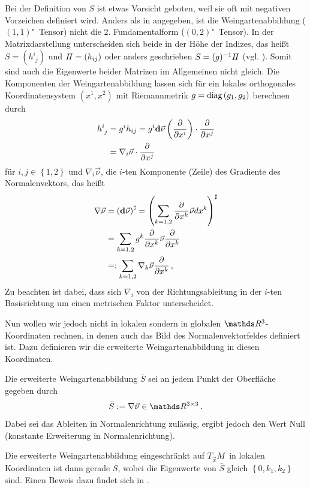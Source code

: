   Bei der Definition von \( S \) ist etwas Vorsicht geboten, weil sie oft mit negativen Vorzeichen definiert wird.
  Anders als in \cite{heine} angegeben, ist die Weingartenabbildung (\( (1,1) \)"~Tensor) nicht die 2. Fundamentalform
  (\( (0,2) \)"~Tensor). 
  In der Matrixdarstellung unterscheiden sich beide in der Höhe der Indizes, das heißt
  \( S = \left(h^{i}_{\phantom{i}j}\right)\) und \( I \! I = \left( h_{ij} \right) \) oder anders geschrieben   \( S = (g)^{-1} I \! I \)
  (vgl. \cite{FirstCourse}).
  Somit sind auch die Eigenwerte beider Matrizen im Allgemeinen nicht gleich.
  Die Komponenten der Weingartenabbildung lassen sich für ein lokales orthogonales Koordinatensystem \( \left( x^{1},x^{2} \right) \)
  mit Riemannmetrik \( g=\text{diag}\left( g_{1},g_{2} \right) \) berechnen durch
  \begin{align}
    h^{i}_{\phantom{i}j} &=  g^{i}h_{ij} = g^{i} \mathbf{d}\vec{\nu}\left(\frac{\partial}{\partial x^{i}}\right) 
                                                  \cdot \frac{\partial}{\partial x^{j}} \\
                          &= \nabla_{i} \vec{\nu} \cdot \frac{\partial}{\partial x^{j}}
  \end{align}
  für \( i,j\in\left\{ 1,2 \right\} \) und \( \nabla_{i} \vec{\nu} \), die \( i \)-ten Komponente (Zeile) des Gradiente des
  Normalenvektors,
  das heißt
  \begin{align}
    \nabla\vec{\nu} &= \left( \mathbf{d} \vec{\nu}\right)^{\sharp}
                     = \left( \sum_{k=1,2} \frac{\partial}{\partial x^{k}} \vec{\nu} dx^{k} \right)^{\sharp} \\
                    &= \sum_{k=1,2} g^{k}\frac{\partial}{\partial x^{k}} \vec{\nu}\frac{\partial}{\partial x^{k}}  \\
                    &=: \sum_{k=1,2} \nabla_{k}\vec{\nu}\frac{\partial}{\partial x^{k}} \,\text{,}
  \end{align}
  Zu beachten ist dabei, dass sich \( \nabla_{i} \) von der Richtungsableitung in der \( i \)-ten Basisrichtung um einen metrischen Faktor
  unterscheidet.

  Nun wollen wir jedoch nicht in lokalen sondern in globalen \( \R^{3} \)-Koordinaten rechnen, in denen auch das Bild des Normalenvektorfeldes
  definiert ist. 
  Dazu definieren wir die erweiterte Weingartenabbildung in diesen Koordinaten.
  \begin{definition}
    Die erweiterte Weingartenabbildung \( \bar{S} \) sei an jedem Punkt der Oberfläche gegeben durch
    \begin{align}
      \bar{S}:= \nabla\vec{\nu} \in \R^{3 \times 3} \formpunkt
    \end{align}
    Dabei sei das Ableiten in Normalenrichtung zulässig, ergibt jedoch den Wert Null (konstante Erweiterung in Normalenrichtung).
  \end{definition}
  Die erweiterte Weingartenabbildung eingeschränkt auf \( T_{\vec{x}}M \)\ in lokalen Koordinaten ist dann gerade \( S \),
  wobei die Eigenwerte von \( \bar{S} \) gleich \( \left\{ 0, k_{1},k_{2} \right\} \) sind.
  Einen Beweis dazu findet sich in \cite[Part 2, Kap.2]{kimura}.
  
